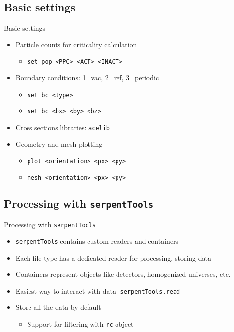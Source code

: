 \documentclass{beamer}
\newcommand{\st}{\texttt{serpentTools} }
\begin{document}
\subsection{Basic settings}

\begin{frame}{Basic settings}
    \begin{itemize}
        \item{Particle counts for criticality calculation}
        \begin{itemize}
            \item{\texttt{set pop <PPC> <ACT> <INACT>}}
        \end{itemize}
        \item{Boundary conditions: 1=vac, 2=ref, 3=periodic}
            \begin{itemize}
                \item{\texttt{set bc <type>}}
                \item{\texttt{set bc <bx> <by> <bz>}}
            \end{itemize}
        \item{Cross sections libraries: \texttt{acelib}}
        \item{Geometry and mesh plotting}
            \begin{itemize}
                \item{\texttt{plot <orientation> <px> <py>}}
                \item{\texttt{mesh <orientation> <px> <py>}}
            \end{itemize}
    \end{itemize}
\end{frame}

\subsection{Processing with \st}

\begin{frame}{Processing with \st}
    \begin{itemize}
        \item{\st contains custom readers and containers}
        \item{Each file type has a dedicated reader for processing, storing data}
        \item{Containers represent objects like detectors, homogenized universes, etc.}
        \item{Easiest way to interact with data: \texttt{serpentTools.read}}
        \item{Store all the data by default}
        \begin{itemize}
            \item{Support for filtering with \texttt{rc} object}
        \end{itemize}
    \end{itemize}
\end{frame}
\end{document}
